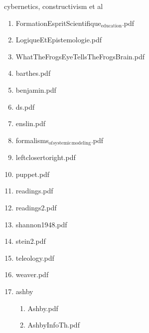 \documentclass[11pt]{article}
\begin{document}
\item cybernetics, constructivism et al
\label{sec-1-1-1-1-18}
\begin{enumerate}
\item FormationEspritScientifique$_{\text{education}}$.pdf
\label{sec-1-1-1-1-18-1}

\item LogiqueEtEpistemologie.pdf
\label{sec-1-1-1-1-18-2}

\item WhatTheFrogsEyeTellsTheFrogsBrain.pdf
\label{sec-1-1-1-1-18-3}

\item barthes.pdf
\label{sec-1-1-1-1-18-4}

\item benjamin.pdf
\label{sec-1-1-1-1-18-5}

\item ds.pdf
\label{sec-1-1-1-1-18-6}

\item enslin.pdf
\label{sec-1-1-1-1-18-7}

\item formalisms$_{\text{of}}$$_{\text{systemic}}$$_{\text{modeling}}$.pdf
\label{sec-1-1-1-1-18-8}

\item leftclosertoright.pdf
\label{sec-1-1-1-1-18-9}

\item puppet.pdf
\label{sec-1-1-1-1-18-10}

\item readings.pdf
\label{sec-1-1-1-1-18-11}

\item readings2.pdf
\label{sec-1-1-1-1-18-12}

\item shannon1948.pdf
\label{sec-1-1-1-1-18-13}

\item stein2.pdf
\label{sec-1-1-1-1-18-14}

\item teleology.pdf
\label{sec-1-1-1-1-18-15}

\item weaver.pdf
\label{sec-1-1-1-1-18-16}

\item ashby
\label{sec-1-1-1-1-18-17}
\begin{enumerate}
\item Ashby.pdf
\label{sec-1-1-1-1-18-17-1}

\item AshbyInfoTh.pdf
\label{sec-1-1-1-1-18-17-2}
\end{enumerate}


\end{enumerate}
\end{document}
